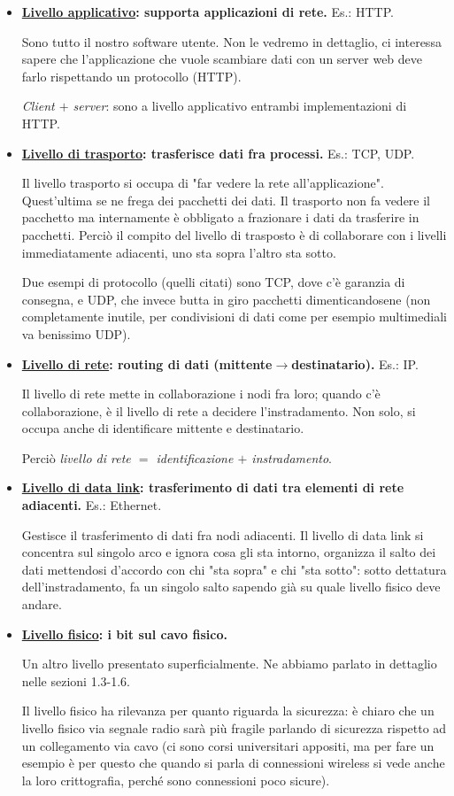 \documentclass[10pt, a4paper, openany]{book}
\begin{document}
\begin{itemize}
    \item \textbf{\underline{Livello applicativo}: supporta applicazioni di rete.} Es.: HTTP.
    
    Sono tutto il nostro software utente. Non le vedremo in dettaglio, ci interessa sapere che l'applicazione che vuole scambiare dati con un server web deve farlo rispettando un protocollo (HTTP).

    \textit{Client $+$ server}: sono a livello applicativo entrambi implementazioni di HTTP.
    \item \textbf{\underline{Livello di trasporto}: trasferisce dati fra processi.} Es.: TCP, UDP.

    Il livello trasporto si occupa di "far vedere la rete all'applicazione". Quest'ultima se ne frega dei pacchetti dei dati. Il trasporto non fa vedere il pacchetto ma internamente è obbligato a frazionare i dati da trasferire in pacchetti. Perciò il compito del livello di trasposto è di collaborare con i livelli immediatamente adiacenti, uno sta sopra l'altro sta sotto.
    
    Due esempi di protocollo (quelli citati) sono TCP, dove c'è garanzia di consegna, e UDP, che invece butta in giro pacchetti dimenticandosene (non completamente inutile, per condivisioni di dati come per esempio multimediali va benissimo UDP).
    \item \textbf{\underline{Livello di rete}: routing di dati (mittente$\rightarrow$destinatario).} Es.: IP.
    
    Il livello di rete mette in collaborazione i nodi fra loro; quando c'è collaborazione, è il livello di rete a decidere l'instradamento. Non solo, si occupa anche di identificare mittente e destinatario.

    Perciò  \textit{livello di rete $=$ identificazione $+$ instradamento}.
    \item \textbf{\underline{Livello di data link}: trasferimento di dati tra elementi di rete adiacenti.} Es.: Ethernet.
    
    Gestisce il trasferimento di dati fra nodi adiacenti. Il livello di data link si concentra sul singolo arco e ignora cosa gli sta intorno, organizza il salto dei dati mettendosi d'accordo con chi "sta sopra" e chi "sta sotto": sotto dettatura dell'instradamento, fa un singolo salto sapendo già su quale livello fisico deve andare.
    \item \textbf{\underline{Livello fisico}: i bit sul cavo fisico.}

    Un altro livello presentato superficialmente. Ne abbiamo parlato in dettaglio nelle sezioni 1.3-1.6.

    Il livello fisico ha rilevanza per quanto riguarda la sicurezza: è chiaro che un livello fisico via segnale radio sarà più fragile parlando di sicurezza rispetto ad un collegamento via cavo (ci sono corsi universitari appositi, ma per fare un esempio è per questo che quando si parla di connessioni wireless si vede anche la loro crittografia, perché sono connessioni poco sicure).
\end{itemize}
\end{document}
